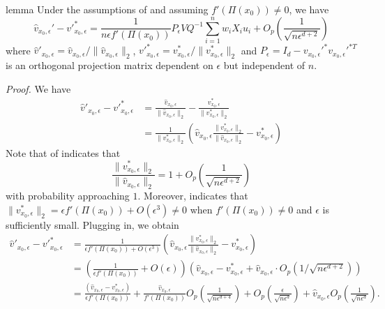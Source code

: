 \documentclass[11pt]{article}
\begin{document}
\begin{restatable}{lemma}{} \label{lemma: norm velocity decomp}
    Under the assumptions of  and assuming $f'(\Pi(x_0)) \neq 0$, we have
    \begin{equation}
        \hat{v}_{x_0, \epsilon}' - v'^*_{x_0, \epsilon} = \frac{1}{n\epsilon f'(\Pi(x_0))}P_\epsilon VQ^{-1}\sum_{i = 1}^nw_iX_iu_i +O_p\left(\frac{1}{\sqrt{n\epsilon^{d+2}}}\right)
    \end{equation}
    where $\hat{v}'_{x_0, \epsilon} = \hat{v}_{x_0, \epsilon}/\|\hat{v}_{x_0, \epsilon}\|_2$, $v'^*_{x_0, \epsilon} = v^*_{x_0, \epsilon}/\|v^*_{x_0, \epsilon}\|_2$ and $P_\epsilon = I_d - v_{x_0, \epsilon}'^{*}v_{x_0, \epsilon}'^{*T}$ is an orthogonal projection matrix dependent on $\epsilon$ but independent of $n$.
\end{restatable}
\noindent \textit{Proof.}  We have
\begin{align*}
    \hat{v}'_{x_0, \epsilon} - v'^*_{x_0, \epsilon} &= \frac{\hat{v}_{x_0, \epsilon}}{\|\hat{v}_{x_0, \epsilon}\|_2} - \frac{v^*_{x_0, \epsilon}}{\|v^*_{x_0, \epsilon}\|_2} \\
    &= \frac{1}{\|v^*_{x_0, \epsilon}\|_2}\left(\hat{v}_{x_0, \epsilon}\frac{\|v^*_{x_0, \epsilon}\|_2}{\|\hat{v}_{x_0, \epsilon}\|_2} - v^*_{x_0, \epsilon}\right)
\end{align*}
Note that  of  indicates that 
\[\frac{\|v^*_{x_0, \epsilon}\|_2}{\|\hat{v}_{x_0, \epsilon}\|_2} = 1 + O_p\left(\frac{1}{\sqrt{n\epsilon^{d+2}}}\right)\]
with probability approaching $1$. Moreover,  indicates that $\|v^*_{x_0, \epsilon}\|_2 = \epsilon f'(\Pi(x_0))+ O(\epsilon^3) \neq 0$ when $f'(\Pi(x_0)) \neq 0$ and $\epsilon$ is sufficiently small. Plugging in, we obtain
\begin{align*}
    \hat{v}'_{x_0, \epsilon} - v'^*_{x_0, \epsilon} &=\frac{1}{\epsilon f'(\Pi(x_0)) + O(\epsilon^3)}\left(\hat{v}_{x_0, \epsilon}\frac{\|v^*_{x_0, \epsilon}\|_2}{\|\hat{v}_{x_0, \epsilon}\|_2} - v^*_{x_0, \epsilon}\right) \\
    &= \left(\frac{1}{\epsilon f'(\Pi(x_0))}  + O(\epsilon)\right)\left(\hat{v}_{x_0, \epsilon} - v^*_{x_0, \epsilon} + \hat{v}_{x_0, \epsilon}\cdot O_p(1/\sqrt{n\epsilon^{d+2}})\right) \\
    &= \frac{(\hat{v}_{x_0, \epsilon} - v^*_{x_0, \epsilon})}{\epsilon f'(\Pi(x_0))} + \frac{\hat{v}_{x_0, \epsilon}}{f'(\Pi(x_0))}O_p\left(\frac{1}{\sqrt{n\epsilon^{d+4}}}\right) + O_p\left(\frac{\epsilon}{\sqrt{n\epsilon^{d}}}\right) +\hat{v}_{x_0, \epsilon}O_p\left(\frac{1}{\sqrt{n\epsilon^{d}}}\right).
\end{align*}
\end{document}
